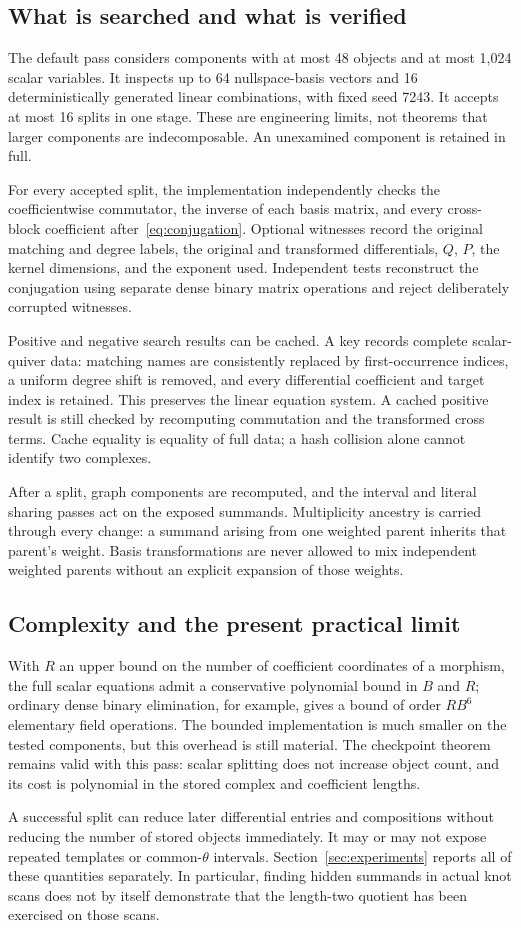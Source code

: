 \subsection{What is searched and what is verified}
The default pass considers components with at most 48 objects and at most
1,024 scalar variables. It inspects up to 64 nullspace-basis vectors and
16 deterministically generated linear combinations, with fixed seed 7243.
It accepts at most 16 splits in one stage. These are engineering limits, not
theorems that larger components are indecomposable. An unexamined component
is retained in full.

For every accepted split, the implementation independently checks the
coefficientwise commutator, the inverse of each basis matrix, and every
cross-block coefficient after~\eqref{eq:conjugation}. Optional witnesses
record the original matching and degree labels, the original and transformed
differentials, $Q$, $P$, the kernel dimensions, and the exponent used.
Independent tests reconstruct the conjugation using separate dense binary
matrix operations and reject deliberately corrupted witnesses.

Positive and negative search results can be cached. A key records complete
scalar-quiver data: matching names are consistently replaced by first-occurrence
indices, a uniform degree shift is removed, and every differential coefficient
and target index is retained. This preserves the linear equation system.
A cached positive result is still checked by recomputing commutation and the
transformed cross terms. Cache equality is equality of full data; a hash
collision alone cannot identify two complexes.

After a split, graph components are recomputed, and the interval and literal
sharing passes act on the exposed summands. Multiplicity ancestry is carried
through every change: a summand arising from one weighted parent inherits
that parent's weight. Basis transformations are never allowed to mix
independent weighted parents without an explicit expansion of those weights.

\subsection{Complexity and the present practical limit}
With $R$ an upper bound on the number of coefficient coordinates of a
morphism, the full scalar equations admit a conservative polynomial bound
in $B$ and $R$; ordinary dense binary elimination, for example, gives a bound
of order $RB^6$ elementary field operations. The bounded implementation is
much smaller on the tested components, but this overhead is still material.
The checkpoint theorem remains valid with this pass: scalar splitting does
not increase object count, and its cost is polynomial in the stored complex
and coefficient lengths.

A successful split can reduce later differential entries and compositions
without reducing the number of stored objects immediately. It may or may not
expose repeated templates or common-$\theta$ intervals. Section~\ref{sec:experiments}
reports all of these quantities separately. In particular, finding hidden
summands in actual knot scans does not by itself demonstrate that the
length-two quotient has been exercised on those scans.

